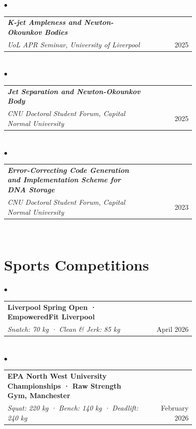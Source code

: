\documentclass[11pt, a4paper]{article}
\begin{document}
\hspace{1em}$\bullet$\quad\begin{tabular}{@{}p{0.75\linewidth}r@{}}\textbf{\textit{K-jet Ampleness and Newton-Okounkov Bodies}}\\
\textit{UoL APR Seminar, University of Liverpool} & 2025\\\end{tabular}\\

\hspace{1em}$\bullet$\quad\begin{tabular}{@{}p{0.75\linewidth}r@{}}\textbf{\textit{Jet Separation and Newton-Okounkov Body}}\\
\textit{CNU Doctoral Student Forum, Capital Normal University} & 2025\\\end{tabular}\\

\hspace{1em}$\bullet$\quad\begin{tabular}{@{}p{0.75\linewidth}r@{}}\textbf{\textit{Error-Correcting Code Generation and Implementation Scheme for DNA Storage}}\\
\textit{CNU Doctoral Student Forum, Capital Normal University} & 2023\\\end{tabular}\\

\section{Sports Competitions}

\hspace{1em}$\bullet$\quad\begin{tabular}{@{}p{0.75\linewidth}r@{}}\textbf{Liverpool Spring Open · EmpoweredFit Liverpool}\\
\textit{Snatch: 70 kg · Clean \& Jerk: 85 kg} & April 2026\\\end{tabular}\\

\hspace{1em}$\bullet$\quad\begin{tabular}{@{}p{0.75\linewidth}r@{}}\textbf{EPA North West University Championships · Raw Strength Gym, Manchester}\\
\textit{Squat: 220 kg · Bench: 140 kg · Deadlift: 240 kg} & February 2026\\\end{tabular}\\
\end{document}
